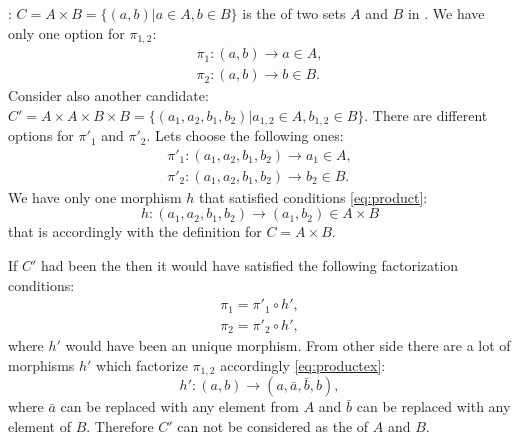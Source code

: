 \begin{example}
\label{ex:set_product}
: $C = A \times B = \{(a,b)| a \in
A, b \in B\}$ is the  of two sets $A$ and $B$ in
. 
We have only one option for $\pi_{1,2}$:
\begin{eqnarray}
\pi_1 : (a,b) \to a \in A,
\nonumber \\
\pi_2 : (a,b) \to b \in B.
\nonumber
\end{eqnarray}
Consider also another candidate: $C' = A \times A
\times B \times B =
\{(a_1,a_2,b_1, b_2)| a_{1,2} \in A, b_{1,2} \in B\}$.
There are different options for $\pi'_1$ and $\pi'_2$. Lets choose the
  following ones:
\begin{eqnarray}
\pi'_1 : (a_1,a_2,b_1, b_2) \to a_1 \in A,
\nonumber \\
\pi'_2 : (a_1,a_2,b_1, b_2) \to b_2 \in B.
\nonumber
\end{eqnarray}
We have only one morphism $h$ that satisfied conditions
\eqref{eq:product}:
\[
h: (a_1,a_2,b_1, b_2) \to (a_1, b_2) \in A \times B
\]
that is accordingly with the  definition for $C = A
\times B$.

If $C'$ had been the  then it would have
satisfied the following factorization conditions:
\begin{eqnarray}
\pi_1 = \pi'_1 \circ h', 
\nonumber \\
\pi_2 = \pi'_2 \circ h',
\label{eq:productex}
\end{eqnarray}
where $h'$ would have been an unique morphism.
From other side there are a lot of morphisms $h'$ which factorize
$\pi_{1,2}$ accordingly \eqref{eq:productex}:
\[
h' : (a,b) \to (a, \bar{a}, \bar{b}, b),
\] 
where $\bar{a}$ can be replaced with any element from $A$ and
$\bar{b}$ can be replaced with any element of $B$. Therefore $C'$ can
not be considered as the  of $A$ and $B$.
\end{example}

